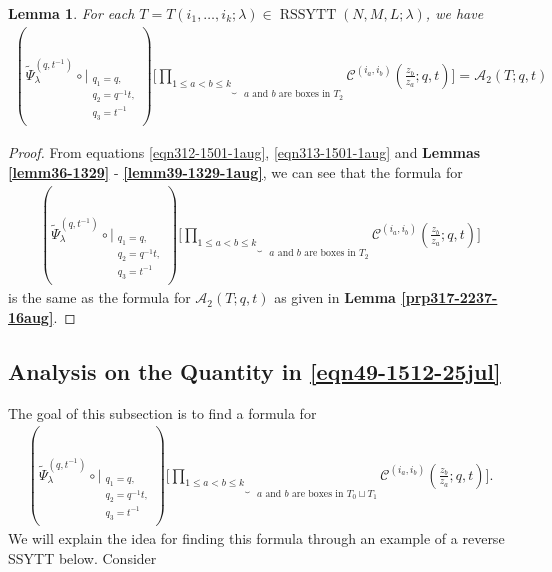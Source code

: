 \documentclass[12pt,reqno,a4paper]{amsart}
\newcommand{\comp}{\circ}
\newcommand{\cals}[1]{\mathcal{#1}}
\numberwithin{equation}{section}
\newtheorem{lem}[thm]{Lemma}
\theoremstyle{definition}
\begin{document}
\begin{lem}
\label{lemm36-1211-27jul}
For each $T = T(i_1,\dots,i_k;\lambda) \in \operatorname{RSSYTT}(N,M,L;\lambda)$, we have 
\begin{align}
	(
	\widetilde{\Psi}_{\lambda}^{(q,t^{-1})}
	\comp 
	\bigg|_{
		\substack{
			q_1 = q, \\
			q_2 = q^{-1}t,\\
			q_3 = t^{-1} \\
		}
	}
	)
	\bigg[
	\underbrace{	\prod_{1 \leq a < b \leq k}				}_{\text{ $a$ and $b$ are boxes in $T_2$}}
	\cals{C}^{(i_a,i_b)}\left(
	\frac{z_b}{z_a}
	; q, t
	\right)
	\bigg]
	= 
	\cals{A}_2(T;q,t)
\end{align}
\end{lem}
\begin{proof}
From equations \eqref{eqn312-1501-1aug}, \eqref{eqn313-1501-1aug} and \textbf{Lemmas \ref{lemm36-1329}} - \textbf{\ref{lemm39-1329-1aug}}, we can see that the formula for 
\begin{align}
(
\widetilde{\Psi}_{\lambda}^{(q,t^{-1})}
\comp 
\bigg|_{
	\substack{
		q_1 = q, \\
		q_2 = q^{-1}t,\\
		q_3 = t^{-1} \\
	}
}
)
\bigg[
\underbrace{	\prod_{1 \leq a < b \leq k}				}_{\text{ $a$ and $b$ are boxes in $T_2$}}
\cals{C}^{(i_a,i_b)}\left(
\frac{z_b}{z_a}
; q, t
\right)
\bigg]
\end{align}
is the same as the formula for $\cals{A}_2(T;q,t)$ as given in \textbf{Lemma \ref{prp317-2237-16aug}}. 
\end{proof}


\subsection{Analysis on the Quantity in  \eqref{eqn49-1512-25jul}}

The goal of this subsection is to find a formula for 
\footnotesize
\begin{align}
(
\widetilde{\Psi}_{\lambda}^{(q,t^{-1})}
\comp 
\bigg|_{
	\substack{
		q_1 = q, \\
		q_2 = q^{-1}t,\\
		q_3 = t^{-1} \\
	}
}
)
\bigg[
\underbrace{	\prod_{1 \leq a < b \leq k}				}_{\text{ $a$ and $b$ are boxes in $T_0 \sqcup T_1$}}
\cals{C}^{(i_a,i_b)}\left(
\frac{z_b}{z_a}
; q, t
\right)
\bigg]. 
\end{align}
\normalsize
We will explain the idea for finding this formula through an example of a reverse SSYTT below. Consider 
\end{document}
